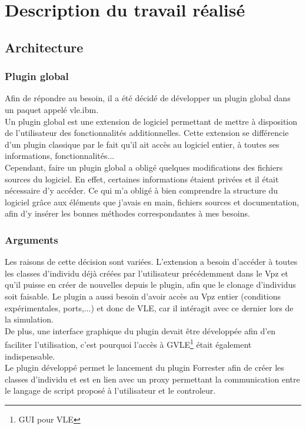 \chapter{Description du travail réalisé}
\setlength{\parskip}{2.5ex plus .4ex minus .4ex}

\section{Architecture}
\subsection{Plugin global}
Afin de répondre au besoin, il a été décidé de développer un plugin global dans un paquet appelé vle.ibm.\\
Un plugin global est une extension de logiciel permettant de mettre à disposition de l'utilisateur des fonctionnalités additionnelles. Cette extension se différencie d'un plugin classique par le fait qu'il ait accès au logiciel entier, à toutes ses informations, fonctionnalités...\\
Cependant, faire un plugin global a obligé quelques modifications des fichiers sources du logiciel. En effet, certaines informations étaient privées et il était nécessaire d'y accéder. Ce qui m'a obligé à bien comprendre la structure du logiciel grâce aux éléments que j'avais en main, fichiers sources et documentation, afin d'y insérer les bonnes méthodes correspondantes à mes besoins.

\subsection{Arguments}
Les raisons de cette décision sont variées. L'extension a besoin d'accéder à toutes les classes d'individu déjà créées par l'utilisateur précédemment dans le Vpz et qu'il puisse en créer de nouvelles depuis le plugin, afin que le clonage d'individus soit faisable. Le plugin a aussi besoin d'avoir accès au Vpz entier (conditions expérimentales, ports,...) et donc de VLE, car il intéragit avec ce dernier lors de la simulation.\\
De plus, une interface graphique du plugin devait être développée afin d'en faciliter l'utilisation, c'est pourquoi l'accès à GVLE\footnote{GUI pour VLE} était également indispensable.\\

Le plugin développé permet le lancement du plugin Forrester afin de créer les classes d'individu et est en lien avec un proxy permettant la communication entre le langage de script proposé à l'utilisateur et le controleur.\\

